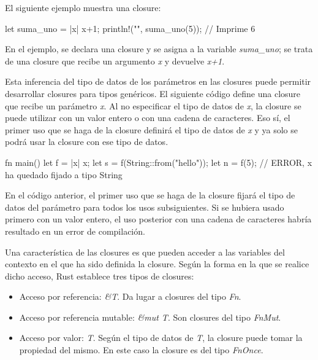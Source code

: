 El siguiente ejemplo muestra una closure:

\vspace{0.7em}
\begin{Codigo}
let suma_uno = |x| x+1;
println!("{}", suma_uno(5)); // Imprime 6
\end{Codigo}

En el ejemplo, se declara una closure y se asigna a la variable \textit{suma\_uno}; se trata de una closure que recibe un argumento \textit{x} y devuelve \textit{x+1}.

Esta inferencia del tipo de datos de los parámetros en las closures puede permitir desarrollar closures para tipos genéricos. El siguiente código define una closure que recibe un parámetro \textit{x}. Al no especificar el tipo de datos de \textit{x}, la closure se puede utilizar con un valor entero o con una cadena de caracteres. Eso sí, el primer uso que se haga de la closure definirá el tipo de datos de \textit{x} y ya solo se podrá usar la closure con ese tipo de datos.

\vspace{0.7em}
\begin{Codigo}
fn main() {
   let f = |x| x;
   let s = f(String::from("hello"));
   let n = f(5); // ERROR, x ha quedado fijado a  tipo String 
}
\end{Codigo}

En el código anterior, el primer uso que se haga de la closure fijará el tipo de datos del parámetro para todos los usos subsiguientes. Si se hubiera usado primero con un valor entero, el uso posterior con una cadena de caracteres habría resultado en un error de compilación. 

Una característica de las closures es que pueden acceder a las variables del contexto en el que ha sido definida la closure. Según la forma en la que se realice dicho acceso, Rust establece tres tipos de closures:

\begin{itemize}
   \item Acceso por referencia: \textit{\&T}. Da lugar a closures del tipo \textit{Fn}.
   \item Acceso por referencia mutable: \textit{\&mut T}. Son closures del tipo \textit{FnMut}.
   \item Acceso por valor: \textit{T}. Según el tipo de datos de \textit{T}, la closure puede tomar la propiedad del mismo. En este caso la closure es del tipo \textit{FnOnce}.
\end{itemize}

